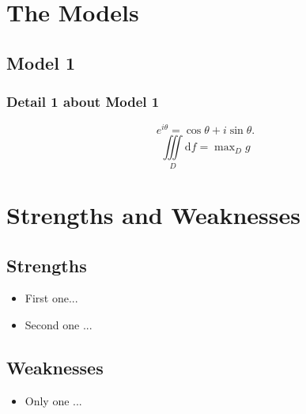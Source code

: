 \documentclass[12pt]{article}
\begin{document}
\section{The Models}
\subsection{Model 1}
\subsubsection{Detail 1 about Model 1}
\begin{equation}
    e^{i\theta}=\cos\theta+i\sin\theta.
\end{equation}
\begin{equation}
	\iiint\limits_D \mathrm{d}f=\max\nolimits_D g
\end{equation}




\section{Strengths and Weaknesses}
\subsection{Strengths}
\begin{itemize}
    \item First one...
    \item Second one ...
\end{itemize}

\subsection{Weaknesses}
\begin{itemize}
    \item Only one ...
 \end{itemize}


\end{document}
